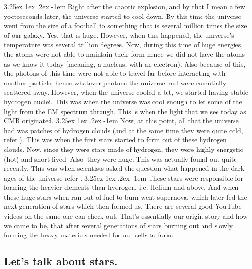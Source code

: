 \documentclass[a4paper,twoside,11pt]{article}
\makeatletter
\numberwithin{equation}{section}
\renewcommand\paragraph{\@startsection{paragraph}{5}{\z@}%
  {3.25ex \@plus1ex \@minus.2ex}%
  {-1em}%
  {\normalfont\normalsize\bfseries}}
\makeatother
\begin{document}
\paragraph{}
Right after the chaotic explosion, and by that I mean a few yoctoseconds later, the universe started to cool down. By this time the universe went from the size of a football to something that is several million times the size of our galaxy. Yes, that is huge. However, when this happened, the universe's temperature was several trillion degrees. Now, during this time of huge energies, the atoms were not able to maintain their form hence we did not have the atoms as we know it today (meaning, a nucleus, with an electron). Also because of this, the photons of this time were not able to travel far before interacting with another particle, hence whatever photons the universe had were essentially scattered away. However, when the universe cooled a bit, we started having stable hydrogen nuclei. This was when the universe was cool enough to let some of the light from the EM spectrum through. This is when the light that we see today as CMB originated. 
\paragraph{}
Now, at this point, all that the universe had was patches of hydrogen clouds (and at the same time they were quite cold, refer \cite{reionisation1}). This was when the first stars started to form out of these hydrogen clouds. Now, since they were stars made of hydrogen, they were highly energetic (hot) and short lived. Also, they were huge. This was actually found out quite recently. This was when scientists asked the question what happened in the dark ages of the universe refer \cite{reionisation1}. 
\paragraph{}
These stars were responsible for forming the heavier elements than hydrogen, i.e. Helium and above. And when these huge stars when ran out of fuel to burn went supernova, which later fed the next generation of stars which then formed us. There are several good YouTube videos on the same one can check out. That's essentially our origin story and how we came to be, that after several generations of stars burning out and slowly forming the heavy materials needed for our cells to form. 
\subsection{Let's talk about stars.}
\end{document}

